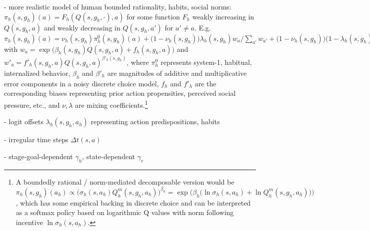 \documentclass[letterpaper]{article} %
\begin{document}
- more realistic model of human bounded rationality, habits, social norms: $\pi_h(s,g_h)(a) = F_h(Q(s,g_h,\cdot),a)$ for some function $F_h$ weakly increasing in $Q(s,g_h,a)$ and weakly decreasing in $Q(s,g_h,a')$ for $a'\neq a$.
E.g. $\pi_h(s,g_h)(a) = \nu_h(s,g_h)\pi^0_h(s,g_h)(a) + \big(1-\nu_h(s,g_h)\big)\lambda_h(s,g_h) w_a/\sum_{a'}w_{a'} + \big(1-\nu_h(s,g_h)\big)\big(1-\lambda_h(s,g_h)\big) w'_a/\sum_{a'}w'_{a'}$ 
with $w_a = \exp\big(\beta_h(s,g_h)Q(s,g_h,a) + f_h(s,g_h,a)\big)$
and $w'_a = f'_h(s,g_h,a) Q(s,g_h,a)^{\beta'_h(s,g_h)}$, 
where $\pi^0_h$ represents system-1, habitual, internalized behavior,
$\beta_h$ and $\beta'_h$ are magnitudes of additive and multiplicative error components in a noisy discrete choice model, 
$f_h$ and $f'_h$ are the corresponding biases representing prior action propensities, perceived social pressure, etc.,
and $\nu,\lambda$ are mixing coefficients.\footnote{%
    A boundedly rational / norm-mediated decomposable version would be $\pi_h(s,g_h)(a_h)\propto \big(\sigma_h(s,a_h) Q_h^m(s,g_h,a_h)\big)^{\beta_h} = \exp\big(\beta_h\big(\ln\sigma_h(s,a_h) + \ln Q^m_h(s,g_h,a_h)\big)\big)$, which has some empirical backing in discrete choice \cite{baum1974two} and can be interpreted as a softmax policy based on logarithmic Q values with norm following incentive $\ln\sigma_h(s,a_h)$. 
    }


- logit offsets $\lambda_h(s,g_h,a_h)$ representing action predispositions, habits

- irregular time steps $\Delta t(s,a)$ 

- stage-goal-dependent $\gamma_h$, state-dependent $\gamma_r$
\end{document}
